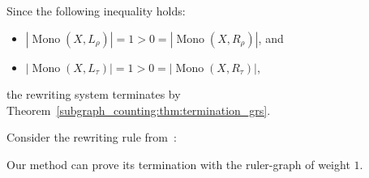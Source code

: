 \begin{example}
  Since the following inequality holds: 
  \begin{itemize}
    \item $|\operatorname{Mono}(X,L_\rho)|\mathop{=}1\mathop{>}0\mathop{=}|\operatorname{Mono}(X,R_\rho)|$, and 
    \item $|\operatorname{Mono}(X,L_\tau)|\mathop{=}1\mathop{>}0\mathop{=}|\operatorname{Mono}(X,R_\tau)|$,
  \end{itemize}
  the rewriting system terminates by Theorem~\ref{subgraph_counting:thm:termination_grs}.
\end{example}

\begin{example} 
  \label{ex:endrullis2024_6d2}  
  Consider the rewriting rule from~\cite[Example 6.2]{endrullis2024generalized_arxiv_v2}:

  \begin{center}
\end{center}

 Our method can prove its termination with the ruler-graph  of weight $1$.
\end{example} 

